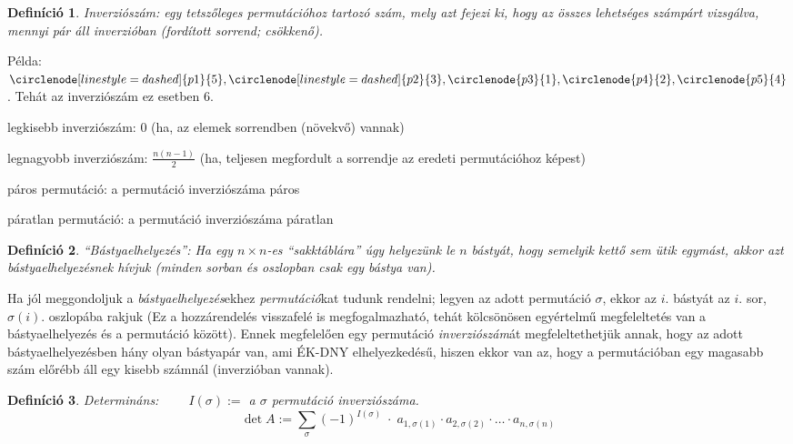 \documentclass[a4paper,12pt,twoside]{book}
\newtheorem{defi}{Definíció}[chapter]
\theoremstyle{break}
\begin{document}
\begin{defi}\emph{Inverziószám}: egy tetszőleges permutációhoz tartozó szám, mely azt fejezi ki, hogy az összes lehetséges számpárt vizsgálva, mennyi pár áll inverzióban (fordított sorrend; csökkenő). \end{defi}
Példa: $\circlenode[linestyle=dashed]{p1}{5},\circlenode[linestyle=dashed]{p2}{3},\circlenode{p3}{1},\circlenode{p4}{2},\circlenode{p5}{4}$. Tehát az inverziószám ez esetben 6.
\\
\begin{itemize*}
    \item legkisebb inverziószám: 0 (ha, az elemek sorrendben (növekvő) vannak)
    \item legnagyobb inverziószám: $\frac{n(n-1)}{2}$ (ha, teljesen megfordult a sorrendje az eredeti permutációhoz képest)
    \item páros permutáció: a permutáció inverziószáma páros
    \item páratlan permutáció: a permutáció inverziószáma páratlan
\end{itemize*}

\begin{defi}\emph{``Bástyaelhelyezés''}: Ha egy $n\times n$-es ``sakktáblára'' úgy helyezünk le $n$ bástyát, hogy semelyik kettő sem ütik egymást, akkor azt bástyaelhelyezésnek hívjuk (minden sorban és oszlopban csak egy bástya van).\end{defi}

Ha jól meggondoljuk a \textit{bástyaelhelyezés}ekhez \textit{permutáció}kat tudunk rendelni; legyen az adott permutáció $\sigma$, ekkor az $i$. bástyát az $i.$ sor, $\sigma(i)$. oszlopába rakjuk (Ez a hozzárendelés visszafelé is megfogalmazható, tehát kölcsönösen egyértelmű megfeleltetés van a bástyaelhelyezés és a permutáció között). Ennek megfelelően egy permutáció \textit{inverziószám}át megfeleltethetjük annak, hogy az adott bástyaelhelyezésben hány olyan bástyapár van, ami ÉK-DNY elhelyezkedésű, hiszen ekkor van az, hogy a permutációban egy magasabb szám előrébb áll egy kisebb számnál (inverzióban vannak).

\begin{defi}\emph{Determináns}: $\qquad I(\sigma) := $ a $\sigma$ permutáció inverziószáma.
\[\boxed{\det A := \sum_{\sigma} (-1)^{I(\sigma)} \;\cdot\; a_{{1},\sigma(1)}\cdot a_{{2},\sigma(2)}\cdot\ldots\cdot a_{{n},\sigma(n)}}\]
\end{defi}
\end{document}
